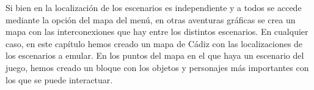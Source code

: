 Si bien en \nombrejuego la localización de los escenarios es independiente y a todos se accede mediante la opción del mapa del menú, en otras aventuras gráficas se crea un mapa con las interconexiones que hay entre los distintos escenarios. En cualquier caso, en este capítulo hemos creado un mapa de Cádiz con las localizaciones de los escenarios a emular. En los puntos del mapa en el que haya un escenario del juego, hemos creado un bloque con los objetos y personajes más importantes con los que se puede interactuar.

